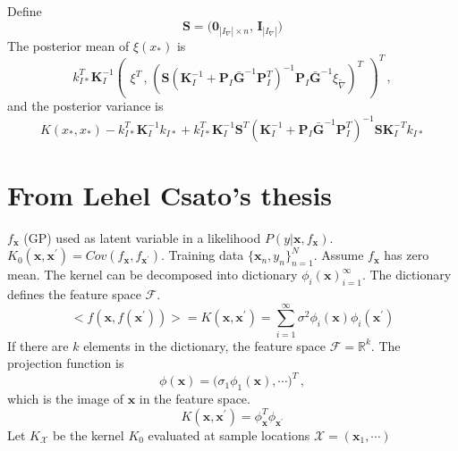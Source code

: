 \documentclass[a4paper,onecolumn]{article}
\begin{document}
Define
$$
    \mathbf{S} = \big(\mathbf{0}_{|I_\nabla|\times n} , \, \mathbf{I}_{|I_\nabla|} \big)
$$
The posterior mean of $\xi(x_*)$ is
$$
    k_{I*}^T \mathbf{K}_I^{-1} \begin{pmatrix} 
    \xi^T\, \textbf{,}\; \left(\mathbf{S} (\mathbf{K}_I^{-1} + \mathbf{P}_I\bar{\mathbf{G}}^{-1} \mathbf{P}_I^T)^{-1}
    \mathbf{P}_I\bar{\mathbf{G}}^{-1}\xi_{\tilde{\nabla}}\right)^T
    \end{pmatrix}^T\,,
$$
and the posterior variance is
$$
    K(x_*, x_*) - k_{I*}^T\mathbf{K}_I^{-1} k_{I*}  +  k_{I*}^T \mathbf{K}_I^{-1}
    \mathbf{S}^T(\mathbf{K}_I^{-1} + \mathbf{P}_I \bar{\mathbf{G}}^{-1} \mathbf{P}_I^T)^{-1}\mathbf{S}
    \mathbf{K}_I^{-T} k_{I*}
$$

\section{From Lehel Csato's thesis}
$f_\mathbf{x}$ (GP) used as latent variable in a likelihood $P(y|\mathbf{x}, f_\mathbf{x})$.
$K_0(\mathbf{x},\mathbf{x}^\prime) = Cov(f_\mathbf{x}, f_{\mathbf{x}^\prime})$. Training data
$\{\mathbf{x}_n, y_n\}_{n=1}^N$. Assume $f_\mathbf{x}$ has zero mean.
The kernel can be decomposed into dictionary $\phi_i(\mathbf{x})_{i=1}^\infty$. The dictionary defines
the feature space $\mathcal{{F}}$.
$$
    <f(\mathbf{x}, f(\mathbf{x}^\prime))> = K(\mathbf{x}, \mathbf{x}^\prime) = 
    \sum_{i=1}^\infty \sigma^2 \phi_i(\mathbf{x}) \phi_i(\mathbf{x}^\prime)
$$
If there are $k$ elements in the dictionary, the feature space $\mathcal{F}=\mathbb{R}^k$.
The projection function is
$$
    \phi(\mathbf{x}) = \big( \sigma_1 \phi_1(\mathbf{x}), \cdots \big)^T\,,
$$
which is the image of $\mathbf{x}$ in the feature space.
$$
    K(\mathbf{x}, \mathbf{x}^\prime) = \phi_{\mathbf{x}}^T \phi_{\mathbf{x}^\prime}
$$
Let $K_\mathcal{X}$ be the kernel $K_0$ evaluated at sample locations $\mathcal{X}=(\mathbf{x}_1, \cdots)$
\end{document}
